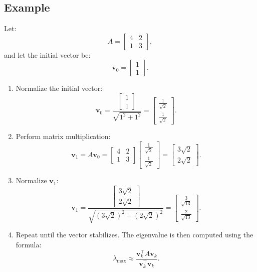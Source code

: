 \documentclass[journal]{IEEEtran}
\begin{document}
\subsection*{Example}
Let:
$$
A = \begin{bmatrix} 4 & 2 \\ 1 & 3 \end{bmatrix},
$$
and let the initial vector be:
$$ \mathbf{v}_0 = \begin{bmatrix} 1 \\ 1 \end{bmatrix}. $$

\begin{enumerate}
    \item Normalize the initial vector:
    $$ \mathbf{v}_0 = \frac{\begin{bmatrix} 1 \\ 1 \end{bmatrix}}{\sqrt{1^2 + 1^2}} = \begin{bmatrix} \frac{1}{\sqrt{2}} \\ \frac{1}{\sqrt{2}} \end{bmatrix}. $$
    \item Perform matrix multiplication:
    $$ \mathbf{v}_1 = A \mathbf{v}_0 = \begin{bmatrix} 4 & 2 \\ 1 & 3 \end{bmatrix} \begin{bmatrix} \frac{1}{\sqrt{2}} \\ \frac{1}{\sqrt{2}} \end{bmatrix} = \begin{bmatrix} 3\sqrt{2} \\ 2\sqrt{2} \end{bmatrix}. $$
    \item Normalize $\mathbf{v}_1$:
    $$ \mathbf{v}_1 = \frac{\begin{bmatrix} 3\sqrt{2} \\ 2\sqrt{2} \end{bmatrix}}{\sqrt{(3\sqrt{2})^2 + (2\sqrt{2})^2}} = \begin{bmatrix} \frac{3}{\sqrt{13}} \\ \frac{2}{\sqrt{13}} \end{bmatrix}. $$
    \item Repeat until the vector stabilizes. The eigenvalue is then computed using the formula:
    $$ \lambda_{\text{max}} \approx \frac{\mathbf{v}_k^\top A \mathbf{v}_k}{\mathbf{v}_k^\top \mathbf{v}_k}. $$ 
\end{enumerate}
\end{document}

